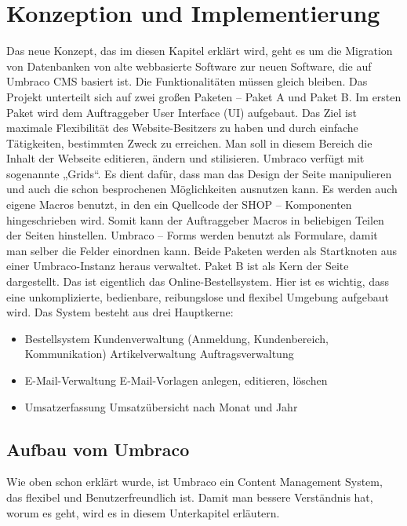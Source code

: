\chapter{Konzeption und Implementierung}

Das neue Konzept, das im diesen Kapitel erklärt wird, geht es um die Migration von Datenbanken von alte webbasierte Software zur neuen Software, die auf Umbraco CMS basiert ist. Die Funktionalitäten müssen gleich bleiben.  
Das Projekt unterteilt sich auf zwei großen Paketen – Paket A und Paket B. 
Im ersten Paket wird dem Auftraggeber User Interface (UI) aufgebaut. Das Ziel ist maximale Flexibilität des Website-Besitzers zu haben und durch einfache Tätigkeiten, bestimmten Zweck zu erreichen. Man soll in diesem Bereich die Inhalt der Webseite editieren, ändern und stilisieren. Umbraco verfügt mit sogenannte „Grids“. Es dient dafür, dass man das Design der Seite manipulieren und auch die schon besprochenen Möglichkeiten ausnutzen kann. 
Es werden auch eigene Macros benutzt, in den ein Quellcode der SHOP – Komponenten hingeschrieben wird. Somit kann der Auftraggeber Macros in beliebigen Teilen der Seiten hinstellen. Umbraco – Forms werden benutzt als Formulare, damit man selber die Felder einordnen kann.
Beide Paketen werden als Startknoten aus einer Umbraco-Instanz heraus verwaltet. 
Paket B ist als Kern der Seite dargestellt. Das ist eigentlich das Online-Bestellsystem. Hier ist es wichtig, dass eine unkomplizierte, bedienbare, reibungslose und flexibel Umgebung aufgebaut wird. Das System besteht aus drei Hauptkerne:
 
\begin{itemize}	
	\item Bestellsystem
	\subitem Kundenverwaltung (Anmeldung, Kundenbereich, Kommunikation)
	\subitem Artikelverwaltung
	\subitem Auftragsverwaltung
	\item E-Mail-Verwaltung
	\subitem E-Mail-Vorlagen anlegen, editieren, löschen
	\item Umsatzerfassung
	\subitem Umsatzübersicht nach Monat und Jahr
\end{itemize}

\section{Aufbau vom Umbraco}

Wie oben schon erklärt wurde, ist Umbraco \cite{Wahlberg2011} ein Content Management System, das flexibel und Benutzerfreundlich ist. Damit man bessere Verständnis hat, worum es geht, wird es in diesem Unterkapitel erläutern. 

